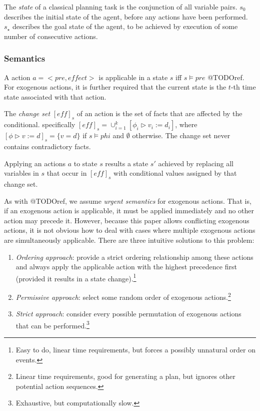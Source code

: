 \documentclass{article}
\theoremstyle{plain}
\theoremstyle{definition}
\begin{document}
The \textit{state} of a classical planning task is the conjunction of all variable pairs. $s_0$ describes the initial state of the agent, before any actions have been performed. $s_\star$ describes the goal state of the agent, to be achieved by execution of some number of consecutive actions.

\subsubsection*{Semantics}
A action $a=<pre, effect>$ is applicable in a state $s$ iff $s\models pre$ @TODOref. For exogenous actions, it is further required that the current state is the $t$-th time state associated with that action. 

The \textit{change set} $[eff]_s$ of an action is the set of facts that are affected by the conditional. specifically $[eff]_s=\cup^k_{i=1}[\phi_i \triangleright v_i:=d_i]$, where $[\phi \triangleright v:=d]_s=\{v=d\}$ if $s \models phi$ and $\emptyset$ otherwise. The change set never contains contradictory facts.

Applying an actions $a$ to state $s$ results a state $s'$ achieved by replacing all variables in $s$ that occur in $[eff]_s$ with conditional values assigned by that change set.

As with @TODOref, we assume \textit{urgent semantics} for exogenous actions. That is, if an exogenous action is applicable, it must be applied immediately and no other action may precede it. However, because this paper allows conflicting exogenous actions, it is not obvious how to deal with cases where multiple exogenous actions are simultaneously applicable. There are three intuitive solutions to this problem:
\begin{enumerate}
\item \textit{Ordering approach}: provide a strict ordering relationship among these actions and always apply the applicable action with the highest precedence first (provided it results in a state change).\footnote{Easy to do, linear time requirements, but forces a possibly unnatural order on events.}
\item \textit{Permissive approach}: select some random order of exogenous actions.\footnote{Linear time requirements, good for generating a plan, but ignores other potential action sequences.}
\item \textit{Strict approach}: consider every possible permutation of exogenous actions that can be performed.\footnote{Exhaustive, but computationally slow.}
\end{enumerate}
\end{document}
